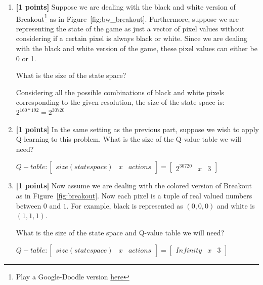 \documentclass[11pt]{article}
\numberwithin{equation}{section} %
\numberwithin{figure}{section} %
\numberwithin{table}{section} %
\begin{document}
\begin{enumerate}
\item \textbf{[1 points]} Suppose we are dealing with the black and white version of Breakout\footnote{Play a Google-Doodle version \href{http://goo.gl/hb5xa}{here}} as in Figure~\ref{fig:bw_breakout}. Furthermore, suppose we are representing the state of the game as just a vector of pixel values without considering if a certain pixel is always black or white. Since we are dealing with the black and white version of the game, these pixel values can either be 0 or 1.

What is the size of the state space?

\begin{tcolorbox}[fit,height=1cm, width=\linewidth, blank, borderline={1pt}{-2pt},nobeforeafter]
Considering all the possible combinations of black and white pixels corresponding to the given resolution, the size of the state space is: $2^{160*192}=2^30720$
\end{tcolorbox}

    
\item \textbf{[1 points]} In the same setting as the previous part, suppose we wish to apply Q-learning to this problem. What is the size of the Q-value table we will need?

\begin{tcolorbox}[fit,height=1cm, width=\linewidth, blank, borderline={1pt}{-2pt},nobeforeafter]
$Q-table:\begin{bmatrix}size(state space) & x & actions \end{bmatrix}=\begin{bmatrix}2^{30720} & x & 3 \end{bmatrix}$
\end{tcolorbox}


\clearpage
\item \textbf{[1 points]} Now assume we are dealing with the colored version of Breakout as in Figure~\ref{fig:breakout}. Now each pixel is a tuple of real valued numbers between $0$ and $1$. For example, black is represented as $(0, 0, 0)$ and white is $(1, 1, 1)$. 

What is the size of the state space and Q-value table we will need?

\begin{tcolorbox}[fit,height=1cm, width=\linewidth, blank, borderline={1pt}{-2pt},nobeforeafter]
$Q-table:\begin{bmatrix}size(state space) & x & actions \end{bmatrix}=\begin{bmatrix}Infinity & x & 3 \end{bmatrix}$
\end{tcolorbox}
\end{enumerate}
\end{document}
